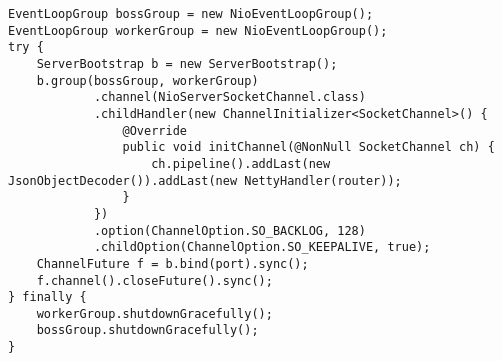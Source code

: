 \begin{lstlisting}
EventLoopGroup bossGroup = new NioEventLoopGroup();
EventLoopGroup workerGroup = new NioEventLoopGroup();
try {
    ServerBootstrap b = new ServerBootstrap();
    b.group(bossGroup, workerGroup)
            .channel(NioServerSocketChannel.class)
            .childHandler(new ChannelInitializer<SocketChannel>() {
                @Override
                public void initChannel(@NonNull SocketChannel ch) {
                    ch.pipeline().addLast(new JsonObjectDecoder()).addLast(new NettyHandler(router));
                }
            })
            .option(ChannelOption.SO_BACKLOG, 128)
            .childOption(ChannelOption.SO_KEEPALIVE, true);
    ChannelFuture f = b.bind(port).sync();
    f.channel().closeFuture().sync();
} finally {
    workerGroup.shutdownGracefully();
    bossGroup.shutdownGracefully();
}
\end{lstlisting}